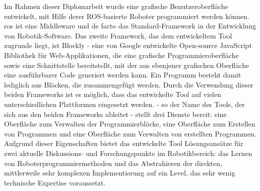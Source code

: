 Im Rahmen dieser Diplomarbeit wurde eine grafische Benutzeroberfl\"ache entwickelt, mit Hilfe derer ROS-basierte Roboter programmiert werden k\"onnen. \gls{ros} ist eine Middleware und de facto das Standard-Framework in der Entwicklung von Robotik-Software. Das zweite Framework, das dem entwickeltem Tool zugrunde liegt, ist Blockly - eine von Google entwickelte Open-source JavaScript Bibliothek f\"ur Web-Applikationen, die eine grafische Programmieroberfl\"ache sowie eine Schnittstelle bereitstellt, mit der aus ebenjener grafischen Oberfl\"ache eine ausf\"uhrbarer Code generiert werden kann. Ein Programm besteht damit lediglich aus Bl\"ocken, die zusammengef\"ugt werden. Durch die Verwendung dieser beiden Frameworks ist es m\"oglich, dass das entwickelte Tool auf vielen unterschiedlichen Plattformen eingesetzt werden. \toolname{} - so der Name des Tools, der sich aus den beiden Frameworks ableitet - stellt drei Dienste bereit: eine Oberfl\"ache zum Verwalten der Programmierbl\"ocke, eine Oberfl\"ache zum Erstellen von Programmen und eine Oberfl\"ache zum Verwalten von erstellten Programmen. Aufgrund dieser Eigenschaften bietet das entwickelte Tool L\"osungsans\"atze f\"ur zwei aktuelle Diskussions- und Forschungspunkte im Robotikbereich: das Lernen von Roboterprogrammiermethoden und das Abstrahieren der direkten, mittlerweile sehr komplexen Implementierung auf ein Level, das sehr wenig technische Expertise voraussetzt.
